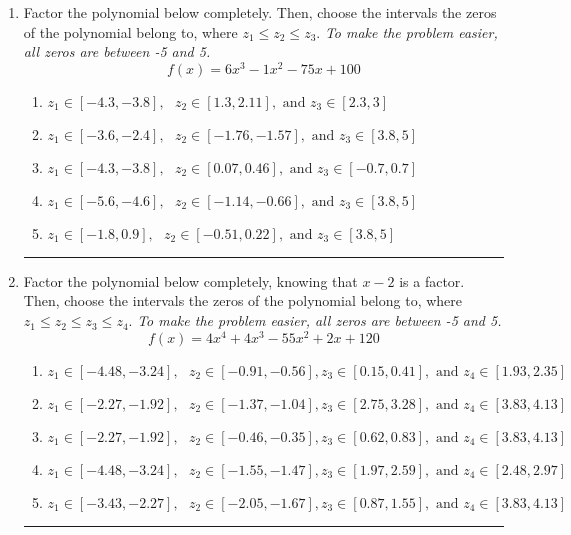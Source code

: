 \documentclass[14pt]{extbook}
\newcommand{\litem}[1]{\item#1\hspace*{-1cm}\rule{\textwidth}{0.4pt}}
\begin{document}
\begin{enumerate}
{\begin{enumerate}[label=\Alph*.]
\end{enumerate} }
\litem{
Factor the polynomial below completely. Then, choose the intervals the zeros of the polynomial belong to, where $z_1 \leq z_2 \leq z_3$. \textit{To make the problem easier, all zeros are between -5 and 5.}\[ f(x) = 6x^{3} -1 x^{2} -75 x + 100 \]\begin{enumerate}[label=\Alph*.]
\item \( z_1 \in [-4.3, -3.8], \text{   }  z_2 \in [1.3, 2.11], \text{   and   } z_3 \in [2.3, 3] \)
\item \( z_1 \in [-3.6, -2.4], \text{   }  z_2 \in [-1.76, -1.57], \text{   and   } z_3 \in [3.8, 5] \)
\item \( z_1 \in [-4.3, -3.8], \text{   }  z_2 \in [0.07, 0.46], \text{   and   } z_3 \in [-0.7, 0.7] \)
\item \( z_1 \in [-5.6, -4.6], \text{   }  z_2 \in [-1.14, -0.66], \text{   and   } z_3 \in [3.8, 5] \)
\item \( z_1 \in [-1.8, 0.9], \text{   }  z_2 \in [-0.51, 0.22], \text{   and   } z_3 \in [3.8, 5] \)

\end{enumerate} }
\litem{
Factor the polynomial below completely, knowing that $x-2$ is a factor. Then, choose the intervals the zeros of the polynomial belong to, where $z_1 \leq z_2 \leq z_3 \leq z_4$. \textit{To make the problem easier, all zeros are between -5 and 5.}\[ f(x) = 4x^{4} +4 x^{3} -55 x^{2} +2 x + 120 \]\begin{enumerate}[label=\Alph*.]
\item \( z_1 \in [-4.48, -3.24], \text{   }  z_2 \in [-0.91, -0.56], z_3 \in [0.15, 0.41], \text{   and   } z_4 \in [1.93, 2.35] \)
\item \( z_1 \in [-2.27, -1.92], \text{   }  z_2 \in [-1.37, -1.04], z_3 \in [2.75, 3.28], \text{   and   } z_4 \in [3.83, 4.13] \)
\item \( z_1 \in [-2.27, -1.92], \text{   }  z_2 \in [-0.46, -0.35], z_3 \in [0.62, 0.83], \text{   and   } z_4 \in [3.83, 4.13] \)
\item \( z_1 \in [-4.48, -3.24], \text{   }  z_2 \in [-1.55, -1.47], z_3 \in [1.97, 2.59], \text{   and   } z_4 \in [2.48, 2.97] \)
\item \( z_1 \in [-3.43, -2.27], \text{   }  z_2 \in [-2.05, -1.67], z_3 \in [0.87, 1.55], \text{   and   } z_4 \in [3.83, 4.13] \)


\end{enumerate}}
\end{enumerate}
\end{document}
